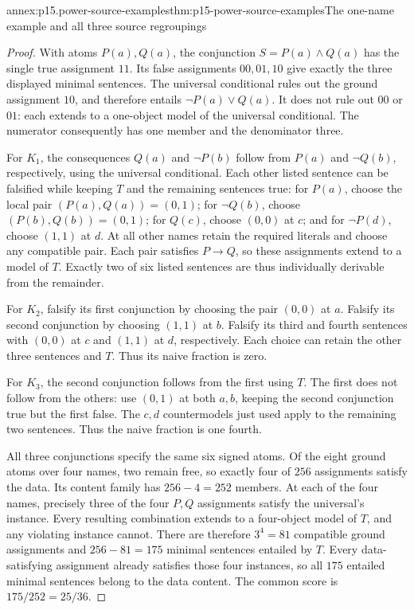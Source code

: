 \begin{annexitem}{annex:p15.power-source-examples}{thm:p15-power-source-examples}{The one-name example and all three source regroupings}
\begin{proof}
With atoms \(P(a),Q(a)\), the conjunction
\(S=P(a)\land Q(a)\) has the single
true assignment \(11\). Its false
assignments \(00,01,10\) give exactly
the three displayed minimal sentences.
The universal conditional rules out
the ground assignment \(10\), and
therefore entails \(\neg P(a)\lor Q(a)\).
It does not rule out \(00\) or \(01\):
each extends to a one-object model
of the universal conditional.
The numerator consequently has one
member and the denominator three.

For \(K_1\), the consequences
\(Q(a)\) and \(\neg P(b)\)
follow from \(P(a)\) and
\(\neg Q(b)\), respectively,
using the universal conditional.
Each other listed sentence can
be falsified while keeping \(T\)
and the remaining sentences true:
for \(P(a)\), choose the local
pair \((P(a),Q(a))=(0,1)\);
for \(\neg Q(b)\), choose
\((P(b),Q(b))=(0,1)\);
for \(Q(c)\), choose \((0,0)\)
at \(c\); and for \(\neg P(d)\),
choose \((1,1)\) at \(d\).
At all other names retain
the required literals and
choose any compatible pair.
Each pair satisfies \(P\to Q\),
so these assignments extend
to a model of \(T\).
Exactly two of six listed
sentences are thus individually
derivable from the remainder.

For \(K_2\), falsify its
first conjunction by choosing
the pair \((0,0)\) at \(a\).
Falsify its second conjunction
by choosing \((1,1)\) at \(b\).
Falsify its third and fourth
sentences with \((0,0)\) at
\(c\) and \((1,1)\) at \(d\),
respectively. Each choice
can retain the other three
sentences and \(T\).
Thus its naive fraction
is zero.

For \(K_3\), the second
conjunction follows from
the first using \(T\).
The first does not follow
from the others: use
\((0,1)\) at both \(a,b\),
keeping the second conjunction
true but the first false.
The \(c,d\) countermodels
just used apply to the
remaining two sentences.
Thus the naive fraction
is one fourth.

All three conjunctions
specify the same six
signed atoms. Of the
eight ground atoms
over four names, two
remain free, so exactly
four of \(256\) assignments
satisfy the data.
Its content family has
\(256-4=252\) members.
At each of the four
names, precisely three
of the four \(P,Q\)
assignments satisfy
the universal's instance.
Every resulting combination
extends to a four-object
model of \(T\), and any
violating instance cannot.
There are therefore
\(3^4=81\) compatible
ground assignments and
\(256-81=175\) minimal
sentences entailed by \(T\).
Every data-satisfying assignment
already satisfies those four
instances, so all \(175\)
entailed minimal sentences
belong to the data content.
The common score is
\(175/252=25/36\).
\end{proof}
\end{annexitem}

